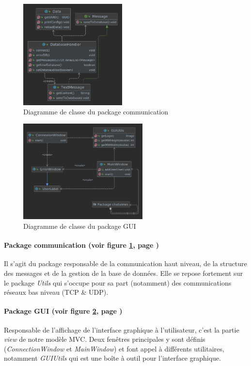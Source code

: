 \documentclass[12pt, a4paper]{article}
\begin{document}
    \begin{figure}[!htp]
        \centering
        \includegraphics[width=0.48\textwidth]{img/class/communication.png}
        \caption{Diagramme de classe du package communication}
        \label{com}
    \end{figure}
    
    \begin{figure}[!htp]
        \centering
        \includegraphics[width=0.58\textwidth]{img/class/gui.png}
        \caption{Diagramme de classe du package GUI}
        \label{gui}
    \end{figure}
    
    \paragraph{Package communication (voir figure \ref{com}, page \pageref{com})} Il s'agit du package responsable de la communication haut niveau, de la structure des messages et de la gestion de la base de données. Elle se repose fortement sur le package \textit{Utils} qui s'occupe pour sa part (notamment) des communications réseaux bas niveau (TCP \& UDP).
    
    \paragraph{Package GUI (voir figure \ref{gui}, page \pageref{gui})} Responsable de l'affichage de l'interface graphique à l'utilisateur, c'est la partie \textit{view} de notre modèle MVC. Deux fenêtres principales y sont définis (\textit{ConnectionWindow} et \textit{MainWindow}) et font appel à différents utilitaires, notamment \textit{GUIUtils} qui est une boîte à outil pour l'interface graphique.
    
\end{document}

